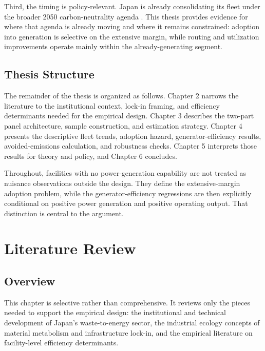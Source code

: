 \documentclass[12pt,a4paper]{article}
\begin{document}
Third, the timing is policy-relevant. Japan is already consolidating its fleet under the broader 2050 carbon-neutrality agenda \citep{MOEJ2024}. This thesis provides evidence for where that agenda is already moving and where it remains constrained: adoption into generation is selective on the extensive margin, while routing and utilization improvements operate mainly within the already-generating segment.

\subsection{Thesis Structure}

The remainder of the thesis is organized as follows. Chapter 2 narrows the literature to the institutional context, lock-in framing, and efficiency determinants needed for the empirical design. Chapter 3 describes the two-part panel architecture, sample construction, and estimation strategy. Chapter 4 presents the descriptive fleet trends, adoption hazard, generator-efficiency results, avoided-emissions calculation, and robustness checks. Chapter 5 interprets those results for theory and policy, and Chapter 6 concludes.

Throughout, facilities with no power-generation capability are not treated as nuisance observations outside the design. They define the extensive-margin adoption problem, while the generator-efficiency regressions are then explicitly conditional on positive power generation and positive operating output. That distinction is central to the argument.


\clearpage
\section{Literature Review}

\subsection{Overview}

This chapter is selective rather than comprehensive. It reviews only the pieces needed to support the empirical design: the institutional and technical development of Japan's waste-to-energy sector, the industrial ecology concepts of material metabolism and infrastructure lock-in, and the empirical literature on facility-level efficiency determinants.
\end{document}
